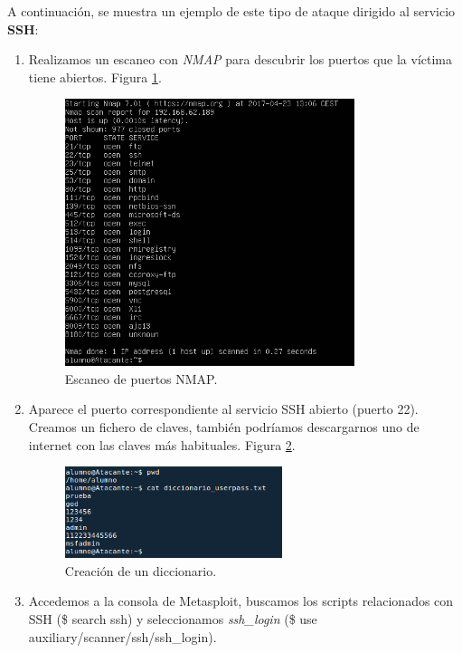 \documentclass[a4,12pt,onecolum]{article}
\begin{document}
A continuación, se muestra un ejemplo de este tipo de ataque dirigido al servicio \textbf{SSH}:
\begin{enumerate}
	\item Realizamos un escaneo con \emph{NMAP} para descubrir los puertos que la víctima tiene abiertos. Figura \ref{fig:ssh1}.
	
\begin{figure}[htbp]
\centering
\includegraphics[width=0.8\textwidth]{./images/ssh/ssh_nmap.png}
\caption{Escaneo de puertos NMAP.}
\label{fig:ssh1}
\end{figure}


	\item Aparece el puerto correspondiente al servicio SSH abierto (puerto 22). Creamos un fichero de claves, también podríamos descargarnos uno de internet con las claves más habituales. Figura \ref{fig:ssh2}.

\begin{figure}[htbp]
\centering
\includegraphics[width=0.6\textwidth]{./images/ssh/ssh_claves.png}
\caption{Creación de un diccionario.}
\label{fig:ssh2}
\end{figure}

	\item Accedemos a la consola de Metasploit, buscamos los scripts relacionados con SSH (\$ search ssh) y seleccionamos \emph{ssh\_login} (\$ use auxiliary/scanner/ssh/ssh\_login).
	

\end{enumerate}
\end{document}

